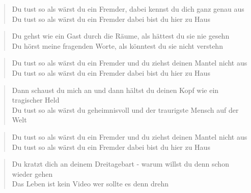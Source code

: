 \documentclass[9pt,a4paper,oneside, onecolumn]{article}
\begin{document}
\begin{verse}

Du \Dm{}tust so als wärst du ein \Gm{}Fremder, dabei \C{}kennst du dich ganz genau \Dm{}aus\\
Du tust so als wärst du ein Fremder dabei bist du hier zu Haus\\

\end{verse}
\begin{verse}

Du \Gm{}gehst wie ein Gast durch die \Dm{}Räume, als \A{}hättest du sie nie ge\Dm{}sehn\\
Du hörst meine fragenden Worte, als könntest du sie nicht verstehn\\

\end{verse}
\begin{verse}

Du \Gm{}tust so als wärst du ein \Dm{}Fremder und du \C{}ziehst deinen Mantel nicht \Dm{}aus\\
Du \Gm{}tust so als wärst du ein \Dm{}Fremder da\A{}bei bist du hier zu \Dm{}Haus\\

\end{verse}
\begin{verse}

Dann \Dm{}schaust du mich an und dann \Gm{}hältst du deinen \C{}Kopf wie ein tragischer \Dm{}Held\\
Du tust so als wärst du geheimnisvoll und der traurigste Mensch auf der Welt\\

\end{verse}
\begin{verse}

Du \Gm{}tust so als wärst du ein \Dm{}Fremder und du \C{}ziehst deinen Mantel nicht \Dm{}aus\\
Du \Gm{}tust so als wärst du ein \Dm{}Fremder da\A{}bei bist du hier zu \Dm{}Haus\\

\end{verse}
\begin{verse}

Du \Dm{}kratzt dich an deinem Drei\Gm{}tagebart - warum \C{}willst du denn schon wieder \Dm{}gehen\\
Das Leben ist kein Video wer sollte es denn drehn\\

\end{verse}
\end{document}
